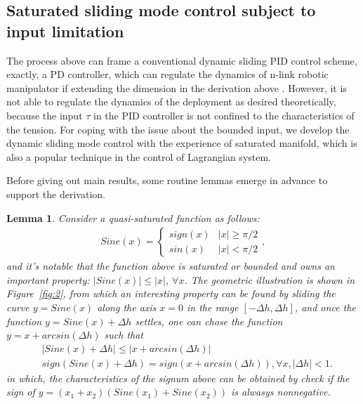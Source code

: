 \documentclass[Journal,letterpaper]{ascelike-new}
\theoremstyle{plain}
\newtheorem{mylem}{Lemma}
\theoremstyle{remark}
\begin{document}
\subsection{Saturated sliding mode control subject to input limitation}
The process above can frame a conventional dynamic sliding PID control scheme, exactly, a PD controller, which can regulate the dynamics of n-link robotic manipulator if extending the dimension in the derivation above \cite{parra2003dynamic}. However, it is not able to regulate the dynamics of the deployment as desired theoretically, because the input $\tau$ in the PID controller is not confined to the characteristics of the tension. For coping with the issue about the bounded input, we develop the dynamic sliding mode control with the experience of saturated manifold, which is also a popular technique in the control of Lagrangian system.\par
Before giving out main results, some routine lemmas emerge in advance to support the derivation.
\begin{mylem}\label{lemma:1}
Consider a quasi-saturated function as follows:
\begin{align}
Sine(x) =
\begin{cases}
sign(x)&\vert x\vert\ge\pi/2\\
sin(x)&\vert x\vert<\pi/2
\end{cases},
\end{align}
and it's notable that the function above is saturated or bounded and owns an important property: $\vert Sine(x)\vert\le\vert x\vert$, $\forall x$. The geometric illustration is shown in Figure~\ref{fig:2}, from which an interesting property can be found by sliding the curve $y=Sine(x)$ along the axis $x=0$ in the range $[-\Delta h,\Delta h]$, and once the function $y=Sine(x)+\Delta h$ settles, one can chose the function $y = x+arcsin(\Delta h)$ such that
\begin{align}
&\vert Sine(x)+\Delta h\vert\le\vert x+arcsin(\Delta h)\vert\\
&sign(Sine(x)+\Delta h)=sign(x+arcsin(\Delta h)), \forall x, \vert\Delta h\vert<1.
\end{align}
in which, the characteristics of the signum above can be obtained by check if the sign of $y=(x_1+x_2)(Sine(x_1)+Sine(x_2))$ is alwasys nonnegative.
\end{mylem}
\end{document}
